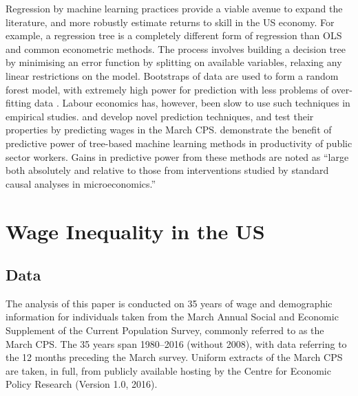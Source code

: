 \documentclass[notitlepage,12pt]{article}
\begin{document}
Regression by machine learning practices provide a viable avenue to expand the literature, and more robustly estimate returns to skill in the US economy.  For example, a regression tree is a completely different form of regression than OLS and common econometric methods.  The process involves building a decision tree by minimising an error function by splitting on available variables, relaxing any linear restrictions on the model.  Bootstraps of data are used to form a random forest model, with extremely high power for prediction with less problems of over-fitting data \citep{breiman2001random}.  Labour economics  has, however, been slow to use such techniques in empirical studies.  \cite{belloni2011high} and \cite{abadie2017risk} develop novel prediction techniques, and test their properties by predicting wages in the March CPS.  \cite{chalfin2016productivity} demonstrate the benefit of predictive power of tree-based machine learning methods in productivity of public sector workers.  Gains in predictive power from these methods are noted as ``large both absolutely and relative to those from interventions studied by standard causal analyses in microeconomics.''

\section{Wage Inequality in the US}
\subsection{Data}
The analysis of this paper is conducted on 35 years of wage and demographic information for individuals taken from the March Annual Social and Economic Supplement of the Current Population Survey, commonly referred to as the March CPS.  The 35 years span 1980--2016 (without 2008), with data referring to the 12 months preceding the March survey.  Uniform extracts of the March CPS are taken, in full, from publicly available hosting by the Centre for Economic Policy Research \nocite{center} (Version 1.0, 2016).
\end{document}
